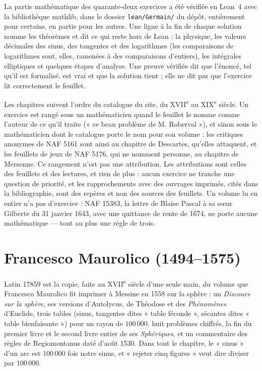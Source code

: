 \documentclass[11pt,a4paper]{article}
\begin{document}
La partie mathématique des quarante-deux exercices a été vérifiée en Lean~4 avec la
bibliothèque mathlib, dans le dossier \texttt{lean/Germain/} du dépôt, entièrement pour
certains, en partie pour les autres. Une ligne à la fin de chaque solution nomme les
théorèmes et dit ce qui reste hors de Lean : la physique, les valeurs décimales des sinus,
des tangentes et des logarithmes (les comparaisons de logarithmes sont, elles, ramenées à
des comparaisons d'entiers), les intégrales elliptiques et quelques étapes d'analyse. Une
preuve vérifiée dit que l'énoncé, tel qu'il est formalisé, est vrai et que la solution
tient ; elle ne dit pas que l'exercice lit correctement le feuillet.

Les chapitres suivent l'ordre du catalogue du site, du XVII\textsuperscript{e} au
XIX\textsuperscript{e} siècle. Un exercice est rangé sous un mathématicien quand le
feuillet le nomme comme l'auteur de ce qu'il traite (« ce beau problème de
M. Roberval »), et sinon sous le mathématicien dont le catalogue porte le nom pour
son volume : les critiques anonymes de NAF 5161 sont ainsi au chapitre de
Descartes, qu'elles attaquent, et les feuillets de jeux de NAF 5176, qui ne
nomment personne, au chapitre de Mersenne. Ce rangement n'est pas une attribution.
Les attributions sont celles des feuillets et des lectures, et rien de plus :
aucun exercice ne tranche une question de priorité, et les rapprochements avec des
ouvrages imprimés, cités dans la bibliographie, sont des repères et non des
sources des feuillets. Un volume lu en entier n'a pas d'exercice : NAF 15383, la
lettre de Blaise Pascal à sa sœur Gilberte du 31 janvier 1643, avec une quittance
de rente de 1674, ne porte aucune mathématique --- tout au plus une règle de
trois.

\section*{Francesco Maurolico (1494--1575)}

Latin 17859 est la copie, faite au XVII\textsuperscript{e} siècle d'une seule
main, du volume que Francesco Maurolico fit imprimer à Messine en 1558 sur la
sphère : un \emph{Discours sur la sphère}, ses versions d'Autolycus, de Théodose
et des \emph{Phénomènes} d'Euclide, trois tables (sinus, tangentes dites « table
féconde », sécantes dites « table bienfaisante ») pour un rayon de $100\,000$,
huit problèmes chiffrés, la fin du premier livre et le second livre entier de
ses \emph{Sphériques}, et un commentaire des règles de Regiomontanus daté d'août
1530. Dans tout le chapitre, le « sinus » d'un arc est $100\,000$ fois notre
sinus, et « rejeter cinq figures » veut dire diviser par $100\,000$.
\end{document}
